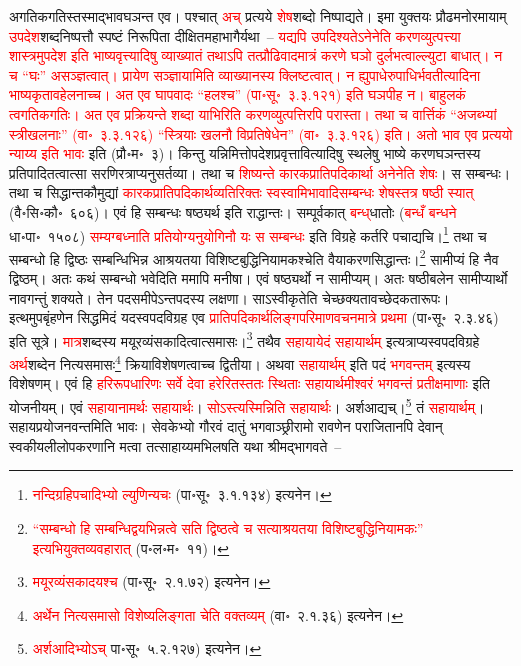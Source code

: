 \begin{sloppypar}
अगतिक\-गतिस्तस्माद्भाव\-घञन्त एव। पश्चात् \textcolor{red}{अच्} प्रत्यये \textcolor{red}{शेष}\-शब्दो निष्पाद्यते। इमा युक्तयः प्रौढमनोरमायाम् \textcolor{red}{उपदेश}\-शब्द\-निष्पत्तौ स्पष्टं निरूपिता दीक्षित\-महाभागैर्यथा~– \textcolor{red}{यद्यपि उपदिश्यतेऽनेनेति करण\-व्युत्पत्त्या शास्त्रमुपदेश इति भाष्य\-वृत्त्यादिषु व्याख्यातं तथाऽपि तत्प्रौढिवादमात्रं करणे घञो दुर्लभत्वाल्ल्युटा बाधात्। न च “घः” असञ्ज्ञत्वात्। प्रायेण सञ्ज्ञायामिति व्याख्यानस्य क्लिष्टत्वात्। न ह्युपाधेरुपाधिर्भवतीत्यादिना भाष्य\-कृतावहेलनाच्च। अत एव घापवादः “हलश्च” (पा॰सू॰~३.३.१२१) इति घञपीह न। बाहुलकं त्वगतिक\-गतिः। अत एव प्रक्रियन्ते शब्दा याभिरिति करण\-व्युत्पत्तिरपि परास्ता। तथा च वार्त्तिकं “अजब्भ्यां स्त्रीखलनाः” (वा॰~३.३.१२६) “स्त्रियाः खलनौ विप्रतिषेधेन” (वा॰~३.३.१२६) इति। अतो भाव एव प्रत्ययो न्याय्य इति भावः} इति (प्रौ॰म॰~३)।
किन्तु यन्निमित्तोपदेश\-प्रवृत्तावित्यादिषु स्थलेषु भाष्ये करण\-घञन्तस्य प्रतिपादितत्वात्सा सरणिरत्राप्यनु\-सर्तव्या। तथा च \textcolor{red}{शिष्यन्ते कारक\-प्रातिपदिकार्था अनेनेति शेषः}। स सम्बन्धः। तथा च सिद्धान्तकौमुद्यां \textcolor{red}{कारक\-प्रातिपदिकार्थ\-व्यतिरिक्तः स्व\-स्वामि\-भावादि\-सम्बन्धः शेषस्तत्र षष्ठी स्यात्} (वै॰सि॰कौ॰~६०६)। एवं हि सम्बन्धः षष्ठ्यर्थ इति राद्धान्तः। सम्पूर्वकात् \textcolor{red}{बन्ध्‌}\-धातोः (\textcolor{red}{बन्धँ बन्धने} धा॰पा॰~१५०८) \textcolor{red}{सम्यग्बध्नाति प्रतियोग्यनुयोगिनौ यः स सम्बन्धः} इति विग्रहे कर्तरि पचाद्यचि।\footnote{\textcolor{red}{नन्दि\-ग्रहि\-पचादिभ्यो ल्युणिन्यचः} (पा॰सू॰~३.१.१३४) इत्यनेन।} तथा च सम्बन्धो हि द्विष्ठः सम्बन्धि\-भिन्न आश्रयतया विशिष्ट\-बुद्धि\-नियामकश्चेति वैयाकरण\-सिद्धान्तः।\footnote{\textcolor{red}{“सम्बन्धो हि सम्बन्धि\-द्वय\-भिन्नत्वे सति द्विष्ठत्वे च सत्याश्रयतया विशिष्टबुद्धिनियामकः” इत्यभियुक्त\-व्यवहारात्} (प॰ल॰म॰~११)।} सामीप्यं हि नैव द्विष्ठम्। अतः कथं सम्बन्धो भवेदिति ममापि मनीषा। एवं षष्ठ्यर्थो न सामीप्यम्। अतः षष्ठी\-बलेन सामीप्यार्थो नावगन्तुं शक्यते। तेन
पद\-समीपेऽन्त\-पदस्य लक्षणा। साऽस्वीकृतेति चेच्छक्यतावच्छेदकता\-रूपः। इत्थमुपबृंहणेन सिद्धमिदं यदस्वपद\-विग्रह एव \textcolor{red}{प्रातिपदिकार्थ\-लिङ्ग\-परिमाण\-वचन\-मात्रे प्रथमा} (पा॰सू॰~२.३.४६) इति सूत्रे। \textcolor{red}{मात्र}\-शब्दस्य मयूर\-व्यंसकादित्वात्समासः।\footnote{\textcolor{red}{मयूरव्यंसकादयश्च} (पा॰सू॰~२.१.७२) इत्यनेन।} तथैव \textcolor{red}{सहायायेदं सहायार्थम्} इत्यत्राप्यस्व\-पद\-विग्रहे \textcolor{red}{अर्थ}\-शब्देन नित्य\-समासः\footnote{\textcolor{red}{अर्थेन नित्य\-समासो विशेष्य\-लिङ्गता चेति वक्तव्यम्‌} (वा॰~२.१.३६) इत्यनेन।} क्रिया\-विशेषणत्वाच्च द्वितीया। अथवा \textcolor{red}{सहायार्थम्} इति पदं \textcolor{red}{भगवन्तम्} इत्यस्य विशेषणम्। एवं हि \textcolor{red}{हरि\-रूप\-धारिणः सर्वे देवा हरेरितस्ततः स्थिताः सहायार्थमीश्वरं भगवन्तं प्रतीक्षमाणाः} इति योजनीयम्। एवं \textcolor{red}{सहायानामर्थः सहायार्थः}। \textcolor{red}{सोऽस्त्यस्मिन्निति सहायार्थः}। अर्शआद्यच्।\footnote{\textcolor{red}{अर्शआदिभ्योऽच्} पा॰सू॰~५.२.१२७) इत्यनेन।} तं \textcolor{red}{सहायार्थम्}। सहाय\-प्रयोजनवन्तमिति भावः। सेवकेभ्यो गौरवं दातुं भगवाञ्छ्रीरामो रावणेन पराजितानपि देवान् स्वकीय\-लीलोपकरणानि मत्वा तत्साहाय्यमभिलषति यथा श्रीमद्भागवते~–\end{sloppypar}
